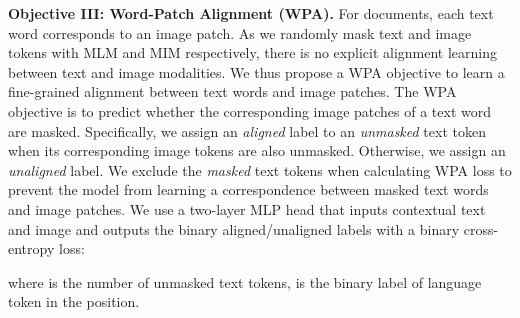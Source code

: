 \documentclass[sigconf]{acmart}
\begin{document}
\noindent \textbf{Objective III: Word-Patch Alignment (WPA).}
For documents, each text word corresponds to an image patch. As we randomly mask text and image tokens with MLM and MIM respectively, there is no explicit alignment learning between text and image modalities.
We thus propose a WPA objective to learn a fine-grained alignment between text words and image patches.
The WPA objective is to predict whether the corresponding image patches of a text word are masked.
Specifically, we assign an \emph{aligned} label to an \emph{unmasked} text token when its corresponding image tokens are also unmasked.
Otherwise, we assign an \emph{unaligned} label.
We exclude the \emph{masked} text tokens when calculating WPA loss to prevent the model from learning a correspondence between masked text words and image patches.
We use a two-layer MLP head that inputs contextual text and image and outputs the binary {aligned}/{unaligned} labels with a binary cross-entropy loss:

where  is the number of unmasked text tokens,  is the binary label of language token in the  position.
\end{document}
